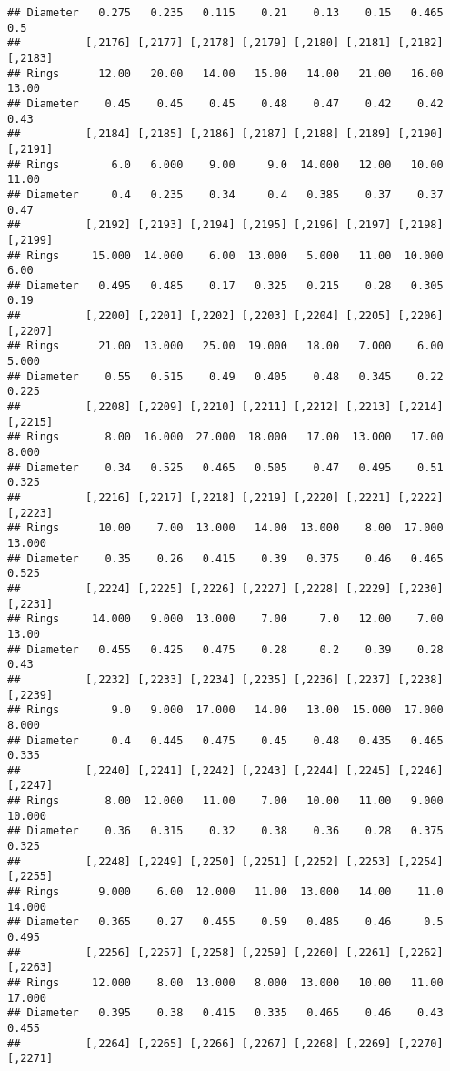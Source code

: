 \documentclass[
]{article}
\begin{document}
\begin{verbatim}
## Diameter   0.275   0.235   0.115    0.21    0.13    0.15   0.465     0.5
##          [,2176] [,2177] [,2178] [,2179] [,2180] [,2181] [,2182] [,2183]
## Rings      12.00   20.00   14.00   15.00   14.00   21.00   16.00   13.00
## Diameter    0.45    0.45    0.45    0.48    0.47    0.42    0.42    0.43
##          [,2184] [,2185] [,2186] [,2187] [,2188] [,2189] [,2190] [,2191]
## Rings        6.0   6.000    9.00     9.0  14.000   12.00   10.00   11.00
## Diameter     0.4   0.235    0.34     0.4   0.385    0.37    0.37    0.47
##          [,2192] [,2193] [,2194] [,2195] [,2196] [,2197] [,2198] [,2199]
## Rings     15.000  14.000    6.00  13.000   5.000   11.00  10.000    6.00
## Diameter   0.495   0.485    0.17   0.325   0.215    0.28   0.305    0.19
##          [,2200] [,2201] [,2202] [,2203] [,2204] [,2205] [,2206] [,2207]
## Rings      21.00  13.000   25.00  19.000   18.00   7.000    6.00   5.000
## Diameter    0.55   0.515    0.49   0.405    0.48   0.345    0.22   0.225
##          [,2208] [,2209] [,2210] [,2211] [,2212] [,2213] [,2214] [,2215]
## Rings       8.00  16.000  27.000  18.000   17.00  13.000   17.00   8.000
## Diameter    0.34   0.525   0.465   0.505    0.47   0.495    0.51   0.325
##          [,2216] [,2217] [,2218] [,2219] [,2220] [,2221] [,2222] [,2223]
## Rings      10.00    7.00  13.000   14.00  13.000    8.00  17.000  13.000
## Diameter    0.35    0.26   0.415    0.39   0.375    0.46   0.465   0.525
##          [,2224] [,2225] [,2226] [,2227] [,2228] [,2229] [,2230] [,2231]
## Rings     14.000   9.000  13.000    7.00     7.0   12.00    7.00   13.00
## Diameter   0.455   0.425   0.475    0.28     0.2    0.39    0.28    0.43
##          [,2232] [,2233] [,2234] [,2235] [,2236] [,2237] [,2238] [,2239]
## Rings        9.0   9.000  17.000   14.00   13.00  15.000  17.000   8.000
## Diameter     0.4   0.445   0.475    0.45    0.48   0.435   0.465   0.335
##          [,2240] [,2241] [,2242] [,2243] [,2244] [,2245] [,2246] [,2247]
## Rings       8.00  12.000   11.00    7.00   10.00   11.00   9.000  10.000
## Diameter    0.36   0.315    0.32    0.38    0.36    0.28   0.375   0.325
##          [,2248] [,2249] [,2250] [,2251] [,2252] [,2253] [,2254] [,2255]
## Rings      9.000    6.00  12.000   11.00  13.000   14.00    11.0  14.000
## Diameter   0.365    0.27   0.455    0.59   0.485    0.46     0.5   0.495
##          [,2256] [,2257] [,2258] [,2259] [,2260] [,2261] [,2262] [,2263]
## Rings     12.000    8.00  13.000   8.000  13.000   10.00   11.00  17.000
## Diameter   0.395    0.38   0.415   0.335   0.465    0.46    0.43   0.455
##          [,2264] [,2265] [,2266] [,2267] [,2268] [,2269] [,2270] [,2271]

\end{verbatim}
\end{document}
